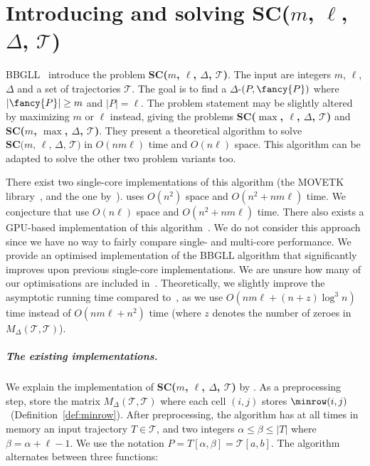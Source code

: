 \documentclass[english, thm-restate]{lipics-v2021}
\begin{document}




\appendix

\newpage
\section{\texorpdfstring{Introducing and solving SC($m$, $\ell$, $\Delta$, $\mathcal{T}$)}{Introducing and solving SC(m, l, D, T)} }
\label{sec:BBGLL}

BBGLL~\cite{buchin2011detecting} introduce the problem \textbf{SC($m$, $\ell$, $\Delta$, $\mathcal{T}$)}.
The input are integers $m$, $\ell$, $\Delta$ and a set of trajectories $\mathcal{T}$.  The goal is to find a $\Delta$-\pathlet $(P, {\fancy{P}})$ where $|{\fancy{P}}| \geq m$ and $|P| = \ell$.  
The problem statement may be slightly altered by maximizing $m$ or $\ell$ instead, giving the problems \textbf{SC($\max$, $\ell$, $\Delta$, $\mathcal{T}$)} and \textbf{SC($m$, $\max$, $\Delta$, $\mathcal{T}$)}.
They present a theoretical algorithm to solve $\textbf{SC($m$, $\ell$, $\Delta$, $\mathcal{T}$)}$ in $O(n m \ell)$ time and $O(n \ell)$ space.
This algorithm can be adapted to solve the other two problem variants too. 


There exist two single-core implementations of this algorithm (the MOVETK library~\cite{movetk}, and the one by~\cite{buchin2017clustering, buchin2020improved}). 
\cite{movetk} uses $O(n^2)$ space and $O(n^2 + n m \ell)$ time.
We conjecture that \cite{buchin2017clustering, buchin2020improved} use $O(n \ell)$ space and $O(n^2 + n m \ell)$ time.
There also exists a GPU-based implementation of this algorithm~\cite{gudmundsson2012gpu}. We do not consider this approach since we have no way to fairly compare single- and multi-core performance.
We provide an optimised implementation of the BBGLL algorithm that significantly improves upon previous single-core implementations. We are unsure how many of our optimisations are included in~\cite{buchin2017clustering, buchin2020improved}. Theoretically, we slightly improve the asymptotic running time compared to~\cite{buchin2011detecting}, as we use $O( n m \ell + (n + z) \log^3 n)$ time instead of $O(n m \ell + n^2)$ time (where $z$ denotes the number of zeroes in $M_\Delta(\mathcal{T}, \mathcal{T})$). 



\subparagraph{The existing implementations.}
We explain the implementation of \textbf{SC($m$, $\ell$, $\Delta$, $\mathcal{T}$)} by \cite{movetk}. 
As a preprocessing step, store the matrix $M_\Delta(\mathcal{T}, \mathcal{T})$ where each cell $(i, j)$ stores $\minrow(i, j)$ ~(Definition~\ref{def:minrow}).
After preprocessing, the algorithm has at all times in memory an input trajectory $T \in \mathcal{T}$, and two integers $\alpha \leq \beta \leq |T|$ where $\beta = \alpha  + \ell - 1$. We use the notation $P = T[\alpha, \beta] = \mathcal{T}[a, b]$. 
The algorithm alternates between three functions: \\
\end{document}
